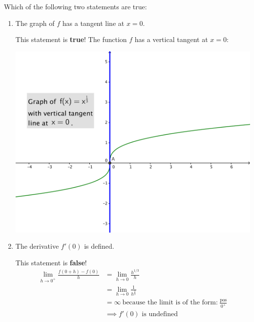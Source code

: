 \documentclass[nooutcomes]{ximera}
\begin{document}
\begin{problem}
  Which of the following two statements are true:
  \begin{enumerate}
     \item The graph of $f$ has a tangent line at $x = 0$.
      \begin{freeResponse}
        This statement is \textbf{true}!
        The function $f$ has a vertical tangent at $x = 0$:
        \begin{image}
          \includegraphics[scale = 0.5]{figure4.png}
        \end{image}
      \end{freeResponse}

    \item  The derivative $f'(0)$ is defined.
      \begin{freeResponse}
        This statement is \textbf{false}!
        \begin{align*}
          \lim_{h \to 0^+} \frac{f(0  + h) - f(0)}{h}
          &= \lim_{h \to 0} \frac{h^{1/3}}{h} \\
          &= \lim_{h \to 0} \frac{1}{h^{\frac{2}{3}}} \\	
          &= \infty\ \text{because the limit is of the form:}\ \frac{\text{pos}}{0^+}\\
          &\implies \mbox{$f'(0)$ is undefined}
        \end{align*}
      \end{freeResponse}
  \end{enumerate}
\end{problem}	
	
			
		
\end{document}
